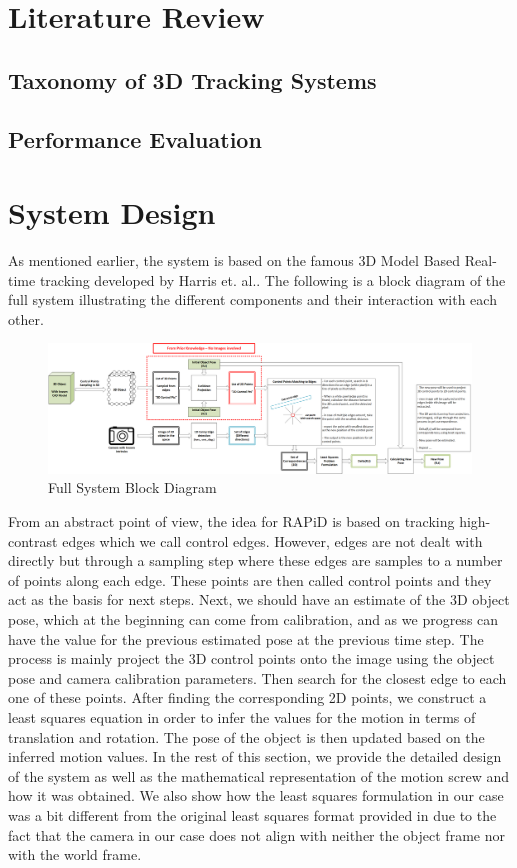 \documentclass{article}
\begin{document}
\section{Literature Review}
\subsection{Taxonomy of 3D Tracking Systems}
\subsection{Performance Evaluation}
\section{System Design}
As mentioned earlier, the system is based on the famous 3D Model Based Real-time tracking developed by Harris et. al.\cite{harris1990rapid}. The following is a block diagram of the full system illustrating the different components and their interaction with each other. 
\begin{figure}[H]
\centering
\includegraphics[width=\textwidth]{RAPiD_BlockDiagram.png}
\caption{Full System Block Diagram}
\end{figure}
From an abstract point of view, the idea for RAPiD\cite{harris1990rapid} is based on tracking high-contrast edges which we call control edges. However, edges are not dealt with directly but through a sampling step where these edges are samples to a number of points along each edge. These points are then called control points and they act as the basis for next steps. Next, we should have an estimate of the 3D object pose, which at the beginning can come from calibration, and as we progress can have the value for the previous estimated pose at the previous time step. The process is mainly project the 3D control points onto the image using the object pose and camera calibration parameters. Then search for the closest edge to each one of these points. After finding the corresponding 2D points, we construct a least squares equation in order to infer the values for the motion in terms of translation and rotation. The pose of the object is then updated based on the inferred motion values. In the rest of this section, we provide the detailed design of the system as well as the mathematical representation of the motion screw and how it was obtained. We also show how the least squares formulation in our case was a bit different from the original least squares format provided in \cite{harris1990rapid} due to the fact that the camera in our case does not align with neither the object frame nor with the world frame. \\
\end{document}
